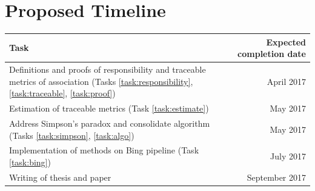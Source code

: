 \documentclass[10pt, onecolumn]{report}
\begin{document}

\section{Proposed Timeline}


\begin{table}[h]
\centering
\begin{tabular}{L{8.5cm}r}
\hline
Task & Expected completion date \\
\hline
Definitions and proofs of responsibility and traceable metrics of association 
(Tasks \ref{task:responsibility}, \ref{task:traceable}, \ref{task:proof}) & April 2017 \\
Estimation of traceable metrics (Task \ref{task:estimate}) & May 2017 \\
Address Simpson's paradox and consolidate algorithm 
(Tasks \ref{task:simpson}, \ref{task:algo}) & May 2017 \\
Implementation of methods on Bing pipeline (Task \ref{task:bing}) & July 2017 \\
Writing of thesis and paper & September 2017 \\
\hline
\end{tabular}
\end{table}
\end{document}
